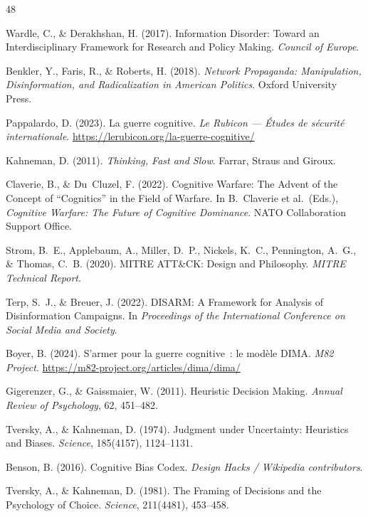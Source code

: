 \documentclass[11pt,a4paper]{article}
\begin{document}
\begin{thebibliography}{48}
\small

Wardle, C., \& Derakhshan, H. (2017). Information Disorder: Toward an Interdisciplinary Framework for Research and Policy Making. \textit{Council of Europe}.

Benkler, Y., Faris, R., \& Roberts, H. (2018). \textit{Network Propaganda: Manipulation, Disinformation, and Radicalization in American Politics}. Oxford University Press.

Pappalardo, D. (2023). La guerre cognitive. \textit{Le Rubicon --- \'Etudes de s\'ecurit\'e internationale}. \url{https://lerubicon.org/la-guerre-cognitive/}

Kahneman, D. (2011). \textit{Thinking, Fast and Slow}. Farrar, Straus and Giroux.

Claverie, B., \& Du~Cluzel, F. (2022). Cognitive Warfare: The Advent of the Concept of ``Cognitics'' in the Field of Warfare. In B.~Claverie et al.\ (Eds.), \textit{Cognitive Warfare: The Future of Cognitive Dominance}. NATO Collaboration Support Office.

Strom, B.~E., Applebaum, A., Miller, D.~P., Nickels, K.~C., Pennington, A.~G., \& Thomas, C.~B. (2020). MITRE ATT\&CK: Design and Philosophy. \textit{MITRE Technical Report}.

Terp, S.~J., \& Breuer, J. (2022). DISARM: A Framework for Analysis of Disinformation Campaigns. In \textit{Proceedings of the International Conference on Social Media and Society}.

Boyer, B. (2024). S'armer pour la guerre cognitive~: le mod\`ele DIMA. \textit{M82 Project}. \url{https://m82-project.org/articles/dima/dima/}

Gigerenzer, G., \& Gaissmaier, W. (2011). Heuristic Decision Making. \textit{Annual Review of Psychology}, 62, 451--482.

Tversky, A., \& Kahneman, D. (1974). Judgment under Uncertainty: Heuristics and Biases. \textit{Science}, 185(4157), 1124--1131.

Benson, B. (2016). Cognitive Bias Codex. \textit{Design Hacks / Wikipedia contributors}.

Tversky, A., \& Kahneman, D. (1981). The Framing of Decisions and the Psychology of Choice. \textit{Science}, 211(4481), 453--458.


\end{thebibliography}
\end{document}
